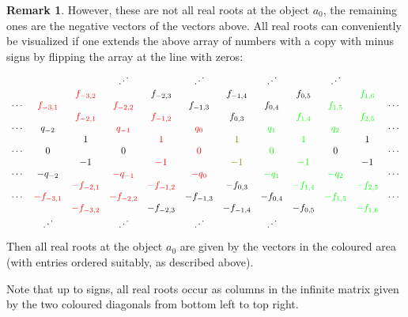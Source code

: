 \documentclass[11pt,a4paper]{amsart}
\theoremstyle{definition}
\newtheorem{Remark}[Lemma]{Remark}
\numberwithin{equation}{section}
\begin{document}
\begin{Remark}
However, these are not all real roots at
the object $a_0$, the remaining ones are 
the negative vectors of the vectors above. 
All real roots can conveniently be 
visualized if one extends the above array
of numbers with a copy with minus signs 
by flipping the array at the line with zeros: 
$$\begin{array}{cccccccccccc}
& & & \iddots & & \iddots & & \iddots & & \iddots & & \\
& & {\color{red} f_{-3,2}}& & f_{-2,3} & & f_{-1,4} & & f_{0,5} & & {\color{green} f_{1,6}} &  \\
 \cdots  & {\color{red}f_{-3,1}} &  & 
 {\color{red} f_{-2,2}} & & f_{-1,3} & & f_{0,4} & & {\color{green} f_{1,5}} & &  \cdots \\
& & {\color{red} f_{-2,1}} & & {\color{red} f_{-1,2}} & & f_{0,3} & & 
{\color{green} f_{1,4}} & & {\color{green} f_{2,5}} &  \\
 \cdots  & q_{-2} & & {\color{red} q_{-1}} & & {\color{red} q_0} & & 
 {\color{green} q_1} & & {\color{green} q_2} & & \cdots \\
&   & 1 & & {\color{red} 1} & & {\color{olive} 1} & & 
{\color{green} 1} & & 1 & \\
\cdots & 0 &  & 0 &  & {\color{red} 0} &  & {\color{green} 0} &  & 0 &  & \cdots  \\
&  & -1 & & {\color{red} -1} & & {\color{olive} -1} & & 
{\color{green} -1} & & -1 & \\
 \cdots  & -q_{-2} & & {\color{red} -q_{-1}} & & {\color{red} -q_0} & & 
 {\color{green} -q_1} & & {\color{green} -q_2} & & \cdots \\
& & {\color{red} -f_{-2,1}} & & 
{\color{red} -f_{-1,2}} & & -f_{0,3} & & 
{\color{green} -f_{1,4}} & & 
{\color{green} -f_{2,5}} &  \\
 \cdots  & {\color{red} -f_{-3,1}} &  & 
 {\color{red} -f_{-2,2}} & & -f_{-1,3} & & -f_{0,4} & & {\color{green} -f_{1,5}} & &  \cdots \\
& & {\color{red} -f_{-3,2}}& & -f_{-2,3} & & 
-f_{-1,4} & & -f_{0,5} & & 
{\color{green} -f_{1,6}} &  \\
& \iddots & & \iddots & & \iddots & & \iddots & & & & \\
 \end{array}
$$
Then all real roots at the object $a_0$ 
are given by the vectors in the coloured
area (with entries ordered suitably, as
described above). 

Note that up to signs, all real roots
occur as columns in the infinite matrix
given by the two coloured diagonals 
from bottom left to top right. 
\end{Remark}
\end{document}
